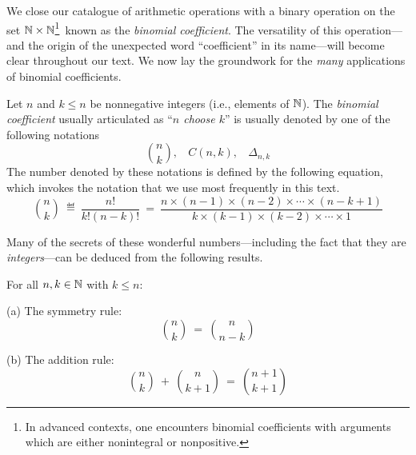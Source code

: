 We close our catalogue of arithmetic operations with a binary operation on the set $\mathbb{N} \times \mathbb{N}$\footnote{In advanced contexts, one encounters binomial coefficients with arguments which are either nonintegral or nonpositive.}~known as the {\it binomial coefficient}.  The versatility of this operation---and the origin of the unexpected word ``coefficient'' in its name---will become clear throughout our text.  We now lay the groundwork for the {\em many} applications of binomial coefficients.


\medskip


Let $n$ and $k \leq n$ be nonnegative integers (i.e., elements of $\mathbb{N}$).  The {\it binomial coefficient} usually articulated as ``{\it $n$ choose $k$}'' is usually denoted by one of the following notations 
\[ {n \choose k}, \ \ \ \ C(n,k), \ \ \ \ \Delta_{n,k} \]
The number denoted by these notations is defined by the following equation, which invokes the notation that we use most frequently in this text.
\begin{equation}
\label{eq:binom-coeff}
{n \choose k} \ \eqdef \ \frac{n!}{k!(n-k)!} \ = \
\frac{n \times (n-1) \times (n-2) \times \cdots \times (n-k+1)}{k \times (k-1) \times (k-2) \times \cdots \times 1}
\end{equation}

\bigskip

Many of the secrets of these wonderful numbers---including the fact that they are {\em integers}---can be deduced from the following results.

 
\begin{prop}
\label{thm:manipulate-binom-coeff}
For all $n, k \in \mathbb{N}$ with $k \leq n$:

{\rm (a)} The symmetry rule:
\begin{equation}
\label{eq:symmetry-binom-coeff}
{n \choose k} \ = \ {n \choose {n-k}}
\end{equation}

{\rm (b)} The addition rule:
\begin{equation}
\label{eq:add-binom-coeff}
{n \choose k} \ + \ {n \choose {k+1}} \ = \ {{n+1} \choose {k+1}}
\end{equation}
\end{prop}

